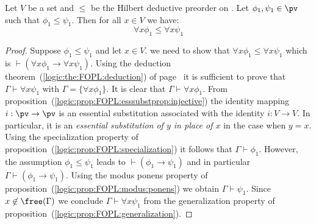 \begin{prop}\label{logic:prop:FOPL:HDC:quasi:quant}
Let $V$ be a set and $\leq$ be the Hilbert deductive preorder on
\pv. Let $\phi_{1},\psi_{1}\in\pv$ such that $\phi_{1}\leq\psi_{1}$.
Then for all $x\in V$ we have:
    \[
    \forall x\phi_{1}\leq\forall x\psi_{1}
    \]
\end{prop}
\begin{proof}
Suppose $\phi_{1}\leq\psi_{1}$ and let $x\in V$. we need to show
that $\forall x\phi_{1}\leq\forall x\psi_{1}$ which is
$\vdash(\forall x\phi_{1}\to\forall x\psi_{1})$. Using the deduction
theorem~(\ref{logic:the:FOPL:deduction}) of
page~\pageref{logic:the:FOPL:deduction} it is sufficient to prove
that $\Gamma\vdash\forall x\psi_{1}$ with $\Gamma=\{\forall
x\phi_{1}\}$. It is clear that $\Gamma\vdash\forall x\phi_{1}$. From
proposition~(\ref{logic:prop:FOPL:esssubstprop:injective}) the
identity mapping $i:\pv\to\pv$ is an essential substitution
associated with the identity $i:V\to V$. In particular, it is an
{\em essential substitution of $y$ in place of $x$} in the case when
$y=x$. Using the specialization property of
proposition~(\ref{logic:prop:FOPL:specialization}) it follows that
$\Gamma\vdash\phi_{1}$. However, the assumption
$\phi_{1}\leq\psi_{1}$ leads to $\vdash(\phi_{1}\to\psi_{1})$ and in
particular $\Gamma\vdash(\phi_{1}\to\psi_{1})$. Using the modus
ponens property of proposition~(\ref{logic:prop:FOPL:modus:ponens})
we obtain $\Gamma\vdash\psi_{1}$. Since $x\not\in\free(\Gamma)$ we
conclude $\Gamma\vdash\forall x\psi_{1}$ from the generalization
property of proposition~(\ref{logic:prop:FOPL:generalization}).
\end{proof}

